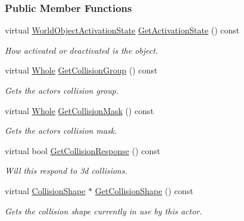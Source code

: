 \subsubsection*{Public Member Functions}
\begin{DoxyCompactItemize}
\item 
virtual \hyperlink{namespaceMezzanine_ac4d9d4570b1963390325ad6a083108e1}{WorldObjectActivationState} \hyperlink{classMezzanine_1_1WorldObjectPhysicsSettings_a4ff60fa3c81d63816b5014d80ec57f26}{GetActivationState} () const 
\begin{DoxyCompactList}\small\item\em How activated or deactivated is the object. \item\end{DoxyCompactList}\item 
virtual \hyperlink{namespaceMezzanine_adcbb6ce6d1eb4379d109e51171e2e493}{Whole} \hyperlink{classMezzanine_1_1WorldObjectPhysicsSettings_a7a3daebdb7d7a40116b1869c59441d2c}{GetCollisionGroup} () const 
\begin{DoxyCompactList}\small\item\em Gets the actors collision group. \item\end{DoxyCompactList}\item 
virtual \hyperlink{namespaceMezzanine_adcbb6ce6d1eb4379d109e51171e2e493}{Whole} \hyperlink{classMezzanine_1_1WorldObjectPhysicsSettings_ad1c74e07047aeebe5fa60504a03a20b9}{GetCollisionMask} () const 
\begin{DoxyCompactList}\small\item\em Gets the actors collision mask. \item\end{DoxyCompactList}\item 
virtual bool \hyperlink{classMezzanine_1_1WorldObjectPhysicsSettings_ab875f0480dbde3dd97a26ddf89bdb6c4}{GetCollisionResponse} () const 
\begin{DoxyCompactList}\small\item\em Will this respond to 3d collisions. \item\end{DoxyCompactList}\item 
virtual \hyperlink{classMezzanine_1_1CollisionShape}{CollisionShape} $\ast$ \hyperlink{classMezzanine_1_1WorldObjectPhysicsSettings_aed89696d6b5f42299d6853dee302bf16}{GetCollisionShape} () const 
\begin{DoxyCompactList}\small\item\em Gets the collision shape currently in use by this actor. \item\end{DoxyCompactList}\item 

\end{DoxyCompactItemize}
